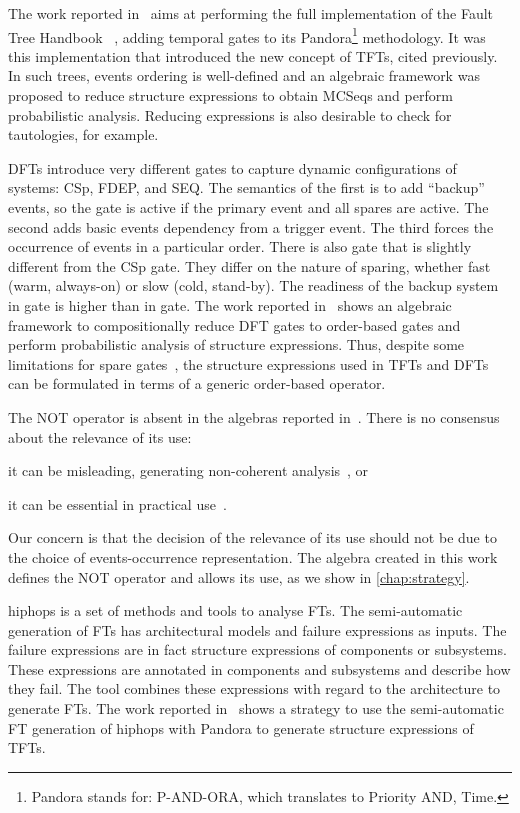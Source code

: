 \documentclass[12pt,openright,twoside,a4paper,oldfontcommands,english,brazil,final]{abntex2}
\theoremstyle{theo}
\def\FThandbook{Fault Tree Handbook~\cite{VGR+1981}\index{Fault Tree!Handbook}%
  \gdef\FThandbook{Fault Tree Handbook\index{Fault Tree!Handbook}\xspace}%
  \xspace}
\def\pandora{Pandora\footnote{Pandora stands for: P-AND-ORA, which translates to Priority AND, Time.}%
  \gdef\pandora{Pandora\xspace}%
  \xspace}
\begin{document}
The work reported in~\cite{WP2009} aims at performing the full implementation of the \FThandbook, adding temporal gates to its \pandora methodology.
It was this implementation that introduced the new concept of \acp{TFT}, cited previously.
In such trees, events ordering is well-defined and an algebraic framework was proposed to reduce structure expressions to obtain \acp{MCSeq} and perform probabilistic analysis.
Reducing expressions is also desirable to check for tautologies, for example.

\Acp{DFT} introduce very different gates to capture dynamic configurations of systems: \ac{CSp}, \ac{FDEP}, and \ac{SEQ}.
The semantics of the first is to add ``backup'' events, so the gate is active if the primary event and all spares are active.
The second adds basic events dependency from a trigger event.
The third forces the occurrence of events in a particular order.
There is also  gate that is slightly different from the \ac{CSp} gate.
They differ on the nature of sparing, whether fast (warm, always-on) or slow (cold, stand-by).
The readiness of the backup system in  gate is higher than in  gate.
The work reported in~\cite{MRL2011} shows an algebraic framework to compositionally reduce \ac{DFT} gates to order-based gates and perform probabilistic analysis of structure expressions. Thus, despite some limitations for spare gates~\cite{MRL2014}, the structure expressions used in \acp{TFT} and \acp{DFT} can be formulated in terms of a generic order-based operator.

\begin{sloppypar}
The \ac{NOT} operator is absent in the algebras reported in~\cite{WP2009,Walker2009,Merle2010,MRL2011b}.
There is no consensus about the relevance of its use:
\begin{alineasinline}
  \item it can be misleading, generating non-coherent analysis~\cite{Oliv2006}, or
  \item it can be essential in practical use~\cite{Andrews2001}.
\end{alineasinline}
Our concern is that the decision of the relevance of its use should not be due to the choice of events-occurrence representation.
The algebra created in this work defines the \ac{NOT} operator and allows its use, as we show in \cref{chap:strategy}.
\end{sloppypar}

\begin{sloppypar}
\Ac{hiphops} is a set of methods and tools to analyse \acp{FT}.
The semi-automatic generation of \acp{FT} has architectural models and failure expressions as inputs.
The failure expressions are in fact structure expressions of components or subsystems.
These expressions are annotated in components and subsystems and describe how they fail.
The tool combines these expressions with regard to the architecture to generate \acp{FT}.
The work reported in~\cite{WP2008} shows a strategy to use the semi-automatic \ac{FT} generation of \ac{hiphops} with \pandora to generate structure expressions of \acp{TFT}.
\end{sloppypar}
\end{document}
